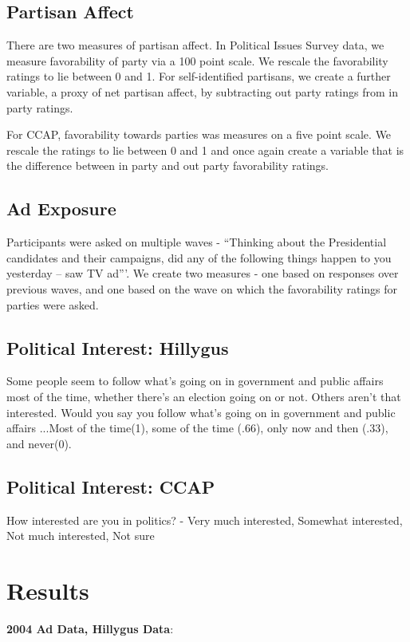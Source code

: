 \documentclass[doc,fignum,noapacite]{apa}
\begin{document}
\subsection{Partisan Affect}
There are two measures of partisan affect. In Political Issues Survey data, we measure favorability of party via 
a 100 point scale. We rescale the favorability ratings to lie between 0 and 1. For self-identified partisans, 
we create a further variable, a proxy of net partisan affect, by subtracting out party ratings from in party ratings. 

For CCAP, favorability towards parties was measures on a five point scale. We rescale the ratings to lie between 0 
and 1 and once again create a variable that is the difference between in party and out party favorability ratings.
	
\subsection{Ad Exposure}
	Participants were asked on multiple waves - ``Thinking about the Presidential candidates and their campaigns, did 
	any of the following things happen to you yesterday -- saw TV ad'''. We create two measures - one based on 
	responses over previous waves, and one based on the wave on which the favorability ratings for parties were asked.

\subsection{Political Interest: Hillygus}
Some people seem to follow what's going on in government and public affairs most of the time, whether there's an 
election going on or not. Others aren't that interested. Would you say you follow what's going on in government and 
public affairs ...Most of the time(1),  some of the time (.66), only now and then (.33), and never(0).

\subsection{Political Interest: CCAP}
How interested are you in politics? - Very much interested, Somewhat interested, Not much interested, Not sure

\section{Results}

\textbf{2004 Ad Data, Hillygus Data}: 
\end{document}
